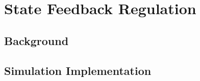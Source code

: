 \documentclass[crop=false,float=true,class=scrreprt]{standalone}
\begin{document}
\section{State Feedback Regulation}

\subsection{Background}
\subsection{Simulation Implementation}




\clearpage
\end{document}
